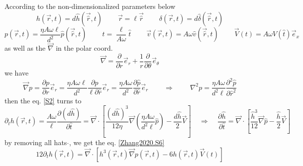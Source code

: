 \documentclass[books,12pt]{elegantpaper}
\newcommand{\tens}{\ \ \ \ \ \ \ \ \ \ }
\newcommand{\fives}{\ \ \ \ \ }
\begin{document}
According to the non-dimensionalized parameters below
\begin{equation} h(\vec{r},t) = d \hat{h}(\vec{\hat{r}},t) \tens \vec{r} = \ell \vec{\hat{r}} \tens \delta(\vec{r},t) = d\hat\delta (\vec{\hat{r}},t) \tag{Zhang2020.S4} \end{equation}
\begin{equation} p(\vec{r},t) = \frac{\eta A \omega \ell}{d^2} \hat{p}(\vec{\hat{r}},t) \tens t = \frac{\ell}{A \omega} \hat{t} \tens \vec{v}(\vec{r},t) = A \omega \hat{v}(\vec{\hat{r}},t) \tens \vec{V}(t) = A \omega \hat{V}(\hat{t}) \vec{e}_x \tag{Zhang2020.S5} \end{equation}
as well as the $\vec\nabla$ in the polar coord.
$$ \vec\nabla = \frac{\partial}{\partial r} \vec{e}_r + \frac{1}{r} \frac{\partial}{\partial \theta} \vec{e}_\theta $$
we have 
$$ \vec\nabla p = \frac{\partial p}{\partial r} \vec{e}_r  = \frac{\eta A \omega \ell}{d^2}\frac{\partial \hat{p}}{\ell \partial \hat{r}} \vec{e}_r = \frac{\eta A \omega}{d^2} \frac{\partial \hat{p}}{\partial \hat{r}} \vec{e}_r \tens \Rightarrow \tens \nabla^2 p = \frac{\eta A \omega}{d^2 \ell} \frac{\partial^2 \hat{p}}{\partial \hat{r}^2} $$
then the eq. \ref{S2} turns to 
$$ \partial_t h(\vec{r},t) = \frac{A \omega}{\ell} \frac{\partial (d \hat{h})}{\partial \hat{t}} = \vec\nabla \cdot \left[ \frac{(d\hat{h})^3}{12\eta} \vec\nabla \left( \frac{\eta A \omega}{d^2 \ell} \hat{p} \right) - \frac{d \hat{h}}{2} \vec{V} \right] \fives \Rightarrow \fives \frac{\partial \hat{h}}{\partial \hat{t}} = \vec\nabla \cdot \left[ \frac{\hat{h}^3}{12} \vec\nabla \hat{p} - \frac{\hat{h}}{2} \vec{V} \right] $$
by removing all hats $\hat{}$, we get the eq. \ref{Zhang2020.S6}
\begin{equation} 12 \partial _t h(\vec{r},t) = \vec\nabla \cdot \left[ h^3(\vec{r},t) \vec\nabla p(\vec{r},t) - 6 h(\vec{r},t) \vec{V}(t) \right] \tag{Zhang2020.S6} \label{Zhang2020.S6} \end{equation}
\end{document}
